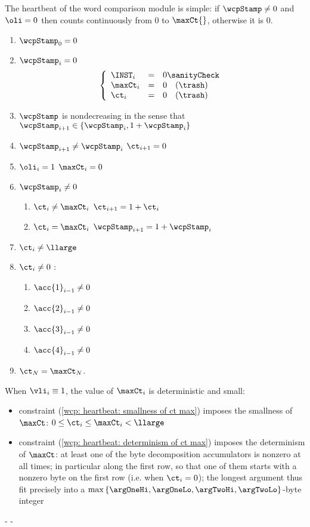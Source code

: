 The heartbeat of the word comparison module is simple: if $\wcpStamp \neq 0$ and $\oli = 0$ then \ct{} counts continuously from $0$ to $\maxCt{}$, otherwise it is $0$.
\begin{enumerate}
	\item $\wcpStamp_{0} = 0$
	\item \If $\wcpStamp_{i} = 0$ \Then
		\[
			\left\{ \begin{array}{lcl}
				\INST_{i}  & = & 0 \sanityCheck   \\
				\maxCt_{i} & = & 0 \quad (\trash) \\
				\ct_{i}    & = & 0 \quad (\trash) \\
			\end{array} \right.
		\]
	\item $\wcpStamp$ is nondecreasing in the sense that $\wcpStamp_{i + 1} \in \{ \wcpStamp_{i}, 1 + \wcpStamp_{i} \}$
	\item \If $\wcpStamp_{i + 1} \neq \wcpStamp_{i}$ \Then $\ct_{i + 1} = 0$
	\item \If $\oli_{i} = 1$ \Then $\maxCt_{i}=0$
	\item \If $\wcpStamp_{i} \neq 0$ \Then
		\begin{enumerate}
			\item \If $\ct_{i} \neq \maxCt_{i}$ \Then $\ct_{i + 1} = 1 + \ct_{i}$
			\item \If $\ct_{i} =    \maxCt_{i}$ \Then $\wcpStamp_{i + 1} = 1 + \wcpStamp_{i}$
		\end{enumerate}
	\item \label{wcp: heartbeat: smallness of ct max}
		$\ct_{i} \neq \llarge$
	\item \label{wcp: heartbeat: determinism of ct max}
		\If $\ct_{i} \neq 0 $ \Then:
		\begin{enumerate}
			\item \Or $\acc{1}_{i - 1} \neq 0$
			\item \Or $\acc{2}_{i - 1} \neq 0$
			\item \Or $\acc{3}_{i - 1} \neq 0$
			\item \Or $\acc{4}_{i - 1} \neq 0$
		\end{enumerate}
	\item $\ct_{N} = \maxCt_{N}$.
\end{enumerate}
\saNote{}
When $\vli_i \equiv 1$, the value of $\maxCt_i$ is deterministic and small:
\begin{itemize}
        \item
		constraint (\ref{wcp: heartbeat: smallness of ct max})
		imposes the smallness of $\maxCt$: $0 \leq \ct_{i} \leq \maxCt_{i} < \llarge$
	\item
		constraint (\ref{wcp: heartbeat: determinism of ct max})
		imposes the determinism of $\maxCt$:
		at least one of the byte decomposition accumulators is nonzero
		at all times;
		in particular along the first row,
		so that one of them starts with a nonzero byte on the first row (i.e. when $\ct_{i} = 0$);
		the longest argument thus fit precisely into a
		$\max \left\{ \argOneHi, \argOneLo, \argTwoHi, \argTwoLo \right\}$-byte
		integer
\end{itemize}
-
-

